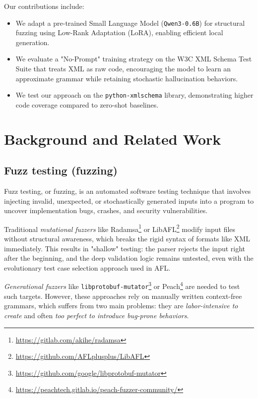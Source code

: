 \documentclass[11pt]{article}
\begin{document}
Our contributions include:
\begin{itemize}
    \item We adapt a pre-trained Small Language Model (\texttt{Qwen3-0.6B}) for structural fuzzing using Low-Rank Adaptation (LoRA), enabling efficient local generation.
    \item We evaluate a "No-Prompt" training strategy on the W3C XML Schema Test Suite that treats XML as raw code, encouraging the model to learn an approximate grammar while retaining stochastic hallucination behaviors.
    \item We test our approach on the \texttt{python-xmlschema} library, demonstrating higher code coverage compared to zero-shot baselines.
\end{itemize}

\section{Background and Related Work}

\subsection{Fuzz testing (fuzzing)}

Fuzz testing, or fuzzing, is an automated software testing technique that involves injecting invalid, unexpected, or stochastically generated inputs into a program to uncover implementation bugs, crashes, and security vulnerabilities.

Traditional \textit{mutational fuzzers} like Radamsa\footnote{\url{https://gitlab.com/akihe/radamsa}} or LibAFL\footnote{\url{https://github.com/AFLplusplus/LibAFL}} modify input files without structural awareness, which breaks the rigid syntax of formats like XML immediately. This results in "shallow" testing: the parser rejects the input right after the beginning, and the deep validation logic remains untested, even with the evolutionary test case selection approach used in AFL.

\textit{Generational fuzzers} like \texttt{libprotobuf-mutator}\footnote{\url{https://github.com/google/libprotobuf-mutator}} or Peach\footnote{\url{https://peachtech.gitlab.io/peach-fuzzer-community/}} are needed to test such targets. However, these approaches rely on manually written context-free grammars, which suffers from two main problems: they are \textit{labor-intensive to create} and often \textit{too perfect to introduce bug-prone behaviors}.
\end{document}
